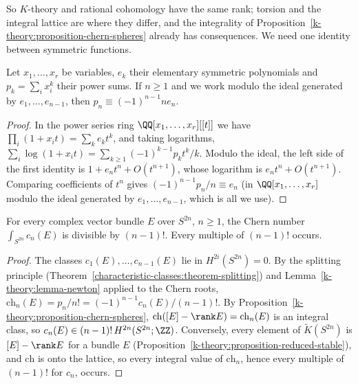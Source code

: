 So $K$-theory and rational cohomology have the same rank; torsion and the integral lattice are where they differ, and the integrality of Proposition~\ref{k-theory:proposition-chern-spheres} already has
consequences. We need one identity between symmetric functions.

\begin{lemma}\label{k-theory:lemma-newton}
Let $x_1, \ldots, x_r$ be variables, $e_k$ their elementary symmetric polynomials and $p_k = \sum_ix_i^k$ their power sums. If $n \geq 1$ and we work modulo the ideal generated by $e_1, \ldots, e_{n-1}$, then
$p_n \equiv (-1)^{n-1}ne_n$.
\end{lemma}

\begin{proof}
In the power series ring $\QQ[x_1, \ldots, x_r][[t]]$ we have $\prod_i(1 + x_it) = \sum_ke_kt^k$, and taking logarithms,
$\sum_i\log(1 + x_it) = \sum_{k \geq 1}(-1)^{k-1}p_kt^k/k$. Modulo the ideal, the left side of the first identity is $1 + e_nt^n + O(t^{n+1})$, whose logarithm is $e_nt^n + O(t^{n+1})$. Comparing coefficients of
$t^n$ gives $(-1)^{n-1}p_n/n \equiv e_n$ (in $\QQ[x_1, \ldots, x_r]$ modulo the ideal generated by $e_1, \ldots, e_{n-1}$, which is all we use).
\end{proof}

\begin{theorem}\label{k-theory:theorem-bott-integrality}
For every complex vector bundle $E$ over $S^{2n}$, $n \geq 1$, the Chern number $\int_{S^{2n}}c_n(E)$ is divisible by $(n - 1)!$. Every multiple of $(n - 1)!$ occurs.
\end{theorem}

\begin{proof}
The classes $c_1(E), \ldots, c_{n-1}(E)$ lie in $H^{2i}(S^{2n}) = 0$. By the splitting principle (Theorem~\ref{characteristic-classes:theorem-splitting}) and Lemma~\ref{k-theory:lemma-newton} applied to the Chern
roots, $\mathrm{ch}_n(E) = p_n/n! = (-1)^{n-1}c_n(E)/(n - 1)!$. By Proposition~\ref{k-theory:proposition-chern-spheres}, $\mathrm{ch}([E] - \rank E) = \mathrm{ch}_n(E)$ is an integral class, so
$c_n(E) \in (n - 1)!\,H^{2n}(S^{2n}; \ZZ)$. Conversely, every element of $\tilde{K}(S^{2n})$ is $[E] - \rank E$ for a bundle $E$ (Proposition~\ref{k-theory:proposition-reduced-stable}), and $\mathrm{ch}$ is onto the
lattice, so every integral value of $\mathrm{ch}_n$, hence every multiple of $(n - 1)!$ for $c_n$, occurs.
\end{proof}

